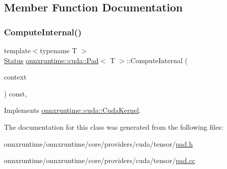 \subsection{Member Function Documentation}
\mbox{\label{classonnxruntime_1_1cuda_1_1Pad_a32053f849d81904ceecb64f8adc82db8}} 
\subsubsection{\texorpdfstring{Compute\+Internal()}{ComputeInternal()}}
{\footnotesize\ttfamily template$<$typename T $>$ \\
\mbox{\hyperlink{classonnxruntime_1_1common_1_1Status}{Status}} \mbox{\hyperlink{classonnxruntime_1_1cuda_1_1Pad}{onnxruntime\+::cuda\+::\+Pad}}$<$ T $>$\+::Compute\+Internal (\begin{DoxyParamCaption}\item[{\mbox{\hyperlink{classonnxruntime_1_1OpKernelContext}{Op\+Kernel\+Context}} $\ast$}]{context }\end{DoxyParamCaption}) const\hspace{0.3cm}{\ttfamily [override]}, {\ttfamily [virtual]}}



Implements \mbox{\hyperlink{classonnxruntime_1_1cuda_1_1CudaKernel_aca7af04ae448017d6023d30bba231ebb}{onnxruntime\+::cuda\+::\+Cuda\+Kernel}}.



The documentation for this class was generated from the following files\+:\begin{DoxyCompactItemize}
\item 
onnxruntime/onnxruntime/core/providers/cuda/tensor/\mbox{\hyperlink{cuda_2tensor_2pad_8h}{pad.\+h}}\item 
onnxruntime/onnxruntime/core/providers/cuda/tensor/\mbox{\hyperlink{cuda_2tensor_2pad_8cc}{pad.\+cc}}\end{DoxyCompactItemize}
